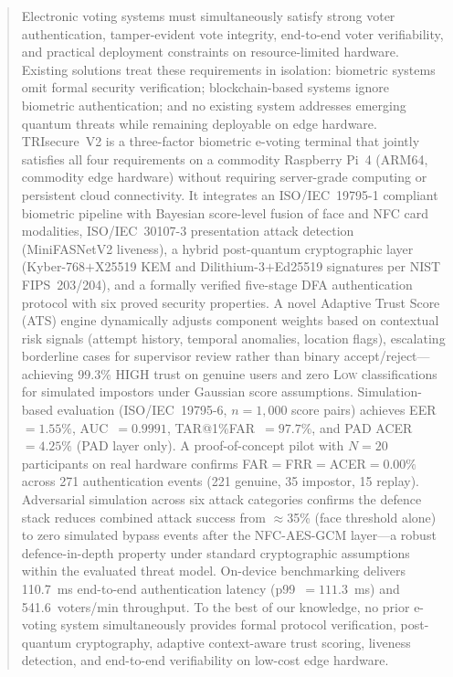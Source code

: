 \documentclass[conference]{IEEEtran}
\begin{document}
\begin{abstract}
Electronic voting systems must simultaneously satisfy strong voter
authentication, tamper-evident vote integrity, end-to-end voter
verifiability, and practical deployment constraints on resource-limited
hardware. Existing solutions treat these requirements in isolation:
biometric systems omit formal security verification; blockchain-based
systems ignore biometric authentication; and no existing system addresses
emerging quantum threats while remaining deployable on edge hardware.
TRIsecure~V2 is a three-factor biometric e-voting terminal that jointly
satisfies all four requirements on a commodity Raspberry Pi~4 (ARM64,
commodity edge hardware) without requiring server-grade computing or persistent cloud
connectivity. It integrates an ISO/IEC~19795-1 compliant biometric pipeline
with Bayesian score-level fusion of face and NFC card modalities,
ISO/IEC~30107-3 presentation attack detection (MiniFASNetV2 liveness),
a hybrid post-quantum cryptographic layer (Kyber-768\(+\)X25519 KEM and
Dilithium-3\(+\)Ed25519 signatures per NIST FIPS~203/204), and a formally
verified five-stage DFA authentication protocol with six proved security
properties. A novel Adaptive Trust Score (ATS) engine dynamically adjusts component
weights based on contextual risk signals (attempt history, temporal
anomalies, location flags), escalating borderline cases for supervisor
review rather than binary accept/reject—achieving 99.3\% HIGH trust on
genuine users and zero \textsc{Low} classifications for simulated impostors
under Gaussian score assumptions.
Simulation-based evaluation (ISO/IEC~19795-6, \(n{=}1{,}000\)
score pairs) achieves EER~\(=1.55\%\), AUC~\(=0.9991\),
TAR@1\%FAR~\(=97.7\%\), and PAD ACER~\(=4.25\%\) (PAD layer only).
A proof-of-concept pilot with \(N{=}20\) participants on real hardware
confirms FAR\(=\)FRR\(=\)ACER\(=0.00\%\) across 271 authentication
events (221 genuine, 35 impostor, 15 replay).
Adversarial simulation across six attack categories confirms the
defence stack reduces combined attack success from \(\approx\)35\% (face
threshold alone) to zero simulated bypass events after the NFC-AES-GCM
layer—a robust defence-in-depth property under standard cryptographic
assumptions within the evaluated threat model.
On-device benchmarking delivers 110.7~ms end-to-end authentication latency
(p99~\(=111.3\)~ms) and 541.6~voters/min throughput. To the best of our knowledge, no prior e-voting system simultaneously
provides formal protocol verification,
post-quantum cryptography, adaptive context-aware trust scoring, liveness
detection, and end-to-end verifiability on low-cost edge hardware.
\end{abstract}
\end{document}
